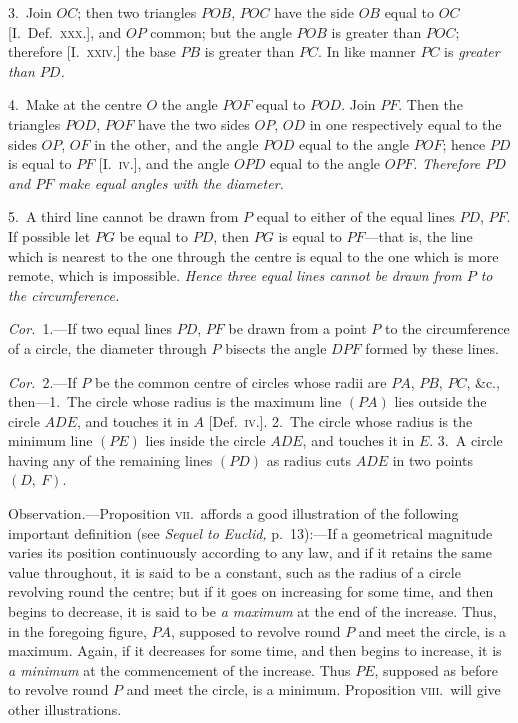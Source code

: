 \documentclass[oneside]{book}
\begin{document}
3.~Join $OC$; then two triangles $POB$, $POC$ have
the side $OB$ equal to $OC$ [I.\ Def.\ \textsc{xxx}.], and $OP$ common;
but the angle $POB$ is greater than $POC$; therefore
[I.\ \textsc{xxiv}.] the base $PB$ is greater than $PC$. In
like manner $PC$ is \emph{greater than $PD$.}

4.~Make at the centre $O$ the angle $POF$ equal to
$POD$. Join $PF$. Then the triangles $POD$, $POF$ have
the two sides $OP$, $OD$ in one respectively equal to the
sides $OP$, $OF$ in the other, and the angle $POD$ equal to
the angle $POF$; hence $PD$ is equal to $PF$ [I.\ \textsc{iv.}], and
the angle $OPD$ equal to the angle $OPF$. \emph{Therefore $PD$
and $PF$ make equal angles with the diameter.}

5.~A third line cannot be drawn from $P$ equal to
either of the equal lines $PD$, $PF$. If possible let $PG$
be equal to $PD$, then $PG$ is equal to $PF$---that is, the
line which is nearest to the one through the centre is
equal to the one which is more remote, which is impossible.
\emph{Hence three equal lines cannot be drawn from
$P$ to the circumference.}

\textit{Cor.}~1.---If two equal lines $PD$, $PF$ be drawn from
a point $P$ to the circumference of a circle, the diameter
through $P$ bisects the angle $DPF$ formed by these
lines.

\textit{Cor.}~2.---If $P$ be the common centre of circles whose
radii are $PA$, $PB$, $PC$, \&c., then---1.\ The circle whose
radius is the maximum line $(PA)$ lies outside the circle
$ADE$, and touches it in $A$ [Def.\ \textsc{iv.}]. 2.~The circle
whose radius is the minimum line $(PE)$ lies inside the
circle $ADE$, and touches it in $E$. 3.~A circle having
any of the remaining lines $(PD)$ as radius cuts $ADE$
in two points $(D,\ F)$.\par\medskip

\begin{footnotesize}
\textsf{Observation.}---Proposition \textsc{vii.}\ affords a good illustration of
the following important definition (see \emph{Sequel to Euclid,} p.~13):---If
a geometrical magnitude varies its position continuously according
to any law, and if it retains the same value throughout,
it is said to be a constant, such as the radius of a circle revolving
round the centre; but if it goes on increasing for some time, and
then begins to decrease, it is said to be \emph{a maximum} at the end of
the increase. Thus, in the foregoing figure, $PA$, supposed to
revolve round $P$ and meet the circle, is a maximum. Again, if it
decreases for some time, and then begins to increase, it is \emph{a minimum}
at the commencement of the increase. Thus $PE$, supposed
as before to revolve round $P$ and meet the circle, is a minimum.
Proposition \textsc{viii.}\ will give other illustrations.
\par\end{footnotesize}
\end{document}
